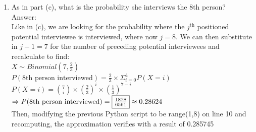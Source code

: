 \documentclass{article}
\begin{document}
\begin{enumerate}
\begin{enumerate}
                        $$  + \binom{6}{3} \times \left(\frac{2}{3}\right)^3 \times \left(\frac{1}{3}\right)^3 $$
                        $$  + \binom{6}{4} \times \left(\frac{2}{3}\right)^4 \times \left(\frac{1}{3}\right)^2 $$
                        $$ = \frac{1}{3^6} + \frac{6\times2}{3^6} + \frac{15\times2^2}{3^6} + \frac{20 \times 2^3}{3^6} + \frac{15\times 2^4}{3^6} $$
                        $$ = \frac{473}{729} $$
                        $$ P(\text{7th person interviewed}) = \frac{2}{3} \times \frac{473}{729} = \fbox{$ \frac{946}{2187} $} \approx 0.432556 $$
                        To verify, I ran the following Python script, which returned $0.433336$
                        \clearpage
                        \begin{lstlisting}
import random

count = 0
trials = 1000000

for _ in range(trials):
    interviews = 0
    
    # Go through persons 1-6
    for person in range(1, 7):
        if random.random() < 2/3:  # Person says yes
            interviews += 1
            if interviews == 5:  # Hit the limit
                break
    
    # Check if we can reach person 7
    if interviews < 5:
        # Ask person 7
        if random.random() < 2/3:  # Person 7 says yes
            count += 1

probability = count / trials
print(f"P(interviews person 7) = {probability}")
                        \end{lstlisting}
                \clearpage
                \item   As in part (c), what is the probability she interviews the 8th person?
                    \\Answer:\\
                    Like in (c), we are looking for the probability where the $j^{\text{th}}$ positioned
                    potential interviewee is interviewed, where now $j = 8$.
                    We can then substitute in $j - 1= 7$ for the number of preceding potential interviewees
                    and recalculate to find:\\
                    $ X \sim Binomial(7,\frac{2}{3}) $\\
                    $ P(\text{8th person interviewed}) = \frac{2}{3} \times \Sigma_{i=0}^{4}P(X=i) $\\
                    $ P(X=i) = \binom{7}{i} \times \left(\frac{2}{3}\right)^i \times \left(\frac{1}{3}\right)^{7-i} $\\
                    $ \Rightarrow P(\text{8th person interviewed}) = \fbox{$\frac{1878}{6561}$} \approx 0.28624 $ \\
                    Then, modifying the previous Python script to be range(1,8) on line 10 and recomputing, 
                    the approximation verifies with a result of 0.285745



\end{enumerate}
\end{enumerate}
\end{document}
